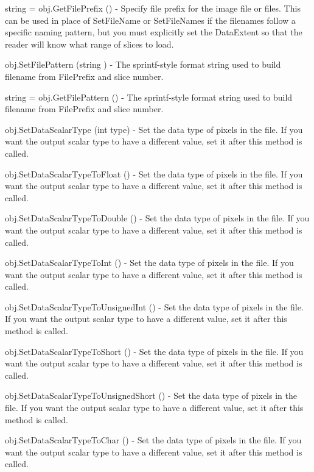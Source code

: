 \begin{DoxyItemize}
\item {\ttfamily string = obj.\-Get\-File\-Prefix ()} -\/ Specify file prefix for the image file or files. This can be used in place of Set\-File\-Name or Set\-File\-Names if the filenames follow a specific naming pattern, but you must explicitly set the Data\-Extent so that the reader will know what range of slices to load.  
\item {\ttfamily obj.\-Set\-File\-Pattern (string )} -\/ The sprintf-\/style format string used to build filename from File\-Prefix and slice number.  
\item {\ttfamily string = obj.\-Get\-File\-Pattern ()} -\/ The sprintf-\/style format string used to build filename from File\-Prefix and slice number.  
\item {\ttfamily obj.\-Set\-Data\-Scalar\-Type (int type)} -\/ Set the data type of pixels in the file. If you want the output scalar type to have a different value, set it after this method is called.  
\item {\ttfamily obj.\-Set\-Data\-Scalar\-Type\-To\-Float ()} -\/ Set the data type of pixels in the file. If you want the output scalar type to have a different value, set it after this method is called.  
\item {\ttfamily obj.\-Set\-Data\-Scalar\-Type\-To\-Double ()} -\/ Set the data type of pixels in the file. If you want the output scalar type to have a different value, set it after this method is called.  
\item {\ttfamily obj.\-Set\-Data\-Scalar\-Type\-To\-Int ()} -\/ Set the data type of pixels in the file. If you want the output scalar type to have a different value, set it after this method is called.  
\item {\ttfamily obj.\-Set\-Data\-Scalar\-Type\-To\-Unsigned\-Int ()} -\/ Set the data type of pixels in the file. If you want the output scalar type to have a different value, set it after this method is called.  
\item {\ttfamily obj.\-Set\-Data\-Scalar\-Type\-To\-Short ()} -\/ Set the data type of pixels in the file. If you want the output scalar type to have a different value, set it after this method is called.  
\item {\ttfamily obj.\-Set\-Data\-Scalar\-Type\-To\-Unsigned\-Short ()} -\/ Set the data type of pixels in the file. If you want the output scalar type to have a different value, set it after this method is called.  
\item {\ttfamily obj.\-Set\-Data\-Scalar\-Type\-To\-Char ()} -\/ Set the data type of pixels in the file. If you want the output scalar type to have a different value, set it after this method is called.  

\end{DoxyItemize}
